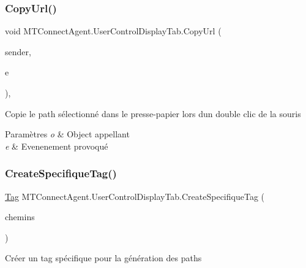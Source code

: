 \subsubsection{\texorpdfstring{Copy\+Url()}{CopyUrl()}}
{\footnotesize\ttfamily void M\+T\+Connect\+Agent.\+User\+Control\+Display\+Tab.\+Copy\+Url (\begin{DoxyParamCaption}\item[{object}]{sender,  }\item[{Mouse\+Event\+Args}]{e }\end{DoxyParamCaption})\hspace{0.3cm}{\ttfamily [inline]}, {\ttfamily [private]}}



Copie le path sélectionné dans le presse-\/papier lors d\textquotesingle{}un double clic de la souris 


\begin{DoxyParams}{Paramètres}
{\em o} & Object appellant\\
\hline
{\em e} & Evenenement provoqué\\
\hline
\end{DoxyParams}
\mbox{\label{class_m_t_connect_agent_1_1_user_control_display_tab_a97ab71f68df06c33f0420131314c8a68}} 
\subsubsection{\texorpdfstring{Create\+Specifique\+Tag()}{CreateSpecifiqueTag()}}
{\footnotesize\ttfamily \mbox{\hyperlink{class_m_t_connect_agent_1_1_model_1_1_tag}{Tag}} M\+T\+Connect\+Agent.\+User\+Control\+Display\+Tab.\+Create\+Specifique\+Tag (\begin{DoxyParamCaption}\item[{List$<$ string $>$}]{chemins }\end{DoxyParamCaption})\hspace{0.3cm}{\ttfamily [inline]}}



Créer un tag spécifique pour la génération des paths 


